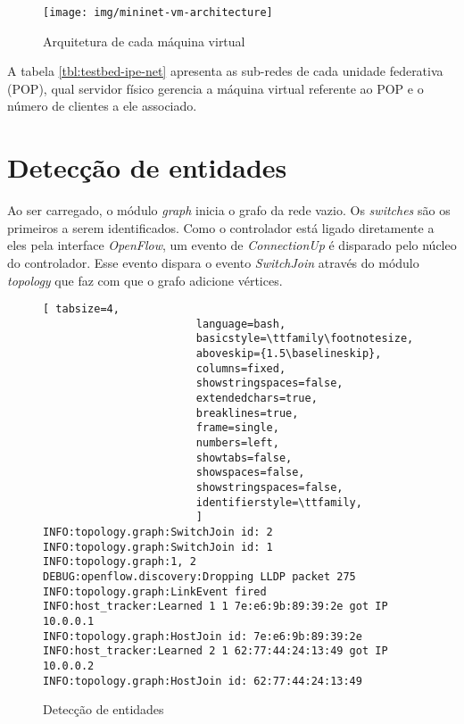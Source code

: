\begin{figure}[h!]
    \centering
    \label{fig:mininet-vm-architecture}
    \texttt{[image: img/mininet-vm-architecture]}
    \caption{Arquitetura de cada máquina virtual}
\end{figure}


A tabela \ref{tbl:testbed-ipe-net} apresenta as sub-redes de cada unidade
federativa (POP), qual servidor físico gerencia a máquina virtual referente
ao POP e o número de clientes a ele associado.




\section{Detecção de entidades}

Ao ser carregado, o módulo \emph{graph} inicia o grafo da rede vazio.
Os \emph{switches} são os primeiros a serem identificados. 
Como o controlador está ligado diretamente a eles pela interface
\emph{OpenFlow}, um evento de \emph{ConnectionUp} é disparado 
pelo núcleo do controlador.
Esse evento dispara o evento \emph{SwitchJoin} através do módulo 
\emph{topology} que faz com que o grafo adicione vértices.

\begin{figure}[h!]
    \centering
    \begin{lstlisting}[ tabsize=4,  
                        language=bash,
                        basicstyle=\ttfamily\footnotesize,
                        aboveskip={1.5\baselineskip},
                        columns=fixed,
                        showstringspaces=false,
                        extendedchars=true,
                        breaklines=true,
                        frame=single,
                        numbers=left,
                        showtabs=false,
                        showspaces=false,
                        showstringspaces=false,
                        identifierstyle=\ttfamily,
                        ]
INFO:topology.graph:SwitchJoin id: 2
INFO:topology.graph:SwitchJoin id: 1
INFO:topology.graph:1, 2
DEBUG:openflow.discovery:Dropping LLDP packet 275
INFO:topology.graph:LinkEvent fired
INFO:host_tracker:Learned 1 1 7e:e6:9b:89:39:2e got IP 10.0.0.1
INFO:topology.graph:HostJoin id: 7e:e6:9b:89:39:2e
INFO:host_tracker:Learned 2 1 62:77:44:24:13:49 got IP 10.0.0.2
INFO:topology.graph:HostJoin id: 62:77:44:24:13:49
        \end{lstlisting}
    \caption{Detecção de entidades}
    \label{fig:detection}
\end{figure}

